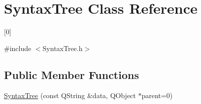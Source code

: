 \hypertarget{class_syntax_tree}{
\section{SyntaxTree Class Reference}
\label{class_syntax_tree}
}


\mbox{[}0\mbox{]}  




{\ttfamily \#include $<$SyntaxTree.h$>$}

\subsection*{Public Member Functions}
\begin{DoxyCompactItemize}
\item 
\hypertarget{class_syntax_tree_abfd0ac37e1d9cdcb2a32809ee3154748}{
\hyperlink{class_syntax_tree_abfd0ac37e1d9cdcb2a32809ee3154748}{SyntaxTree} (const QString \&data, QObject $\ast$parent=0)}
\label{class_syntax_tree_abfd0ac37e1d9cdcb2a32809ee3154748}


\end{DoxyCompactItemize}
